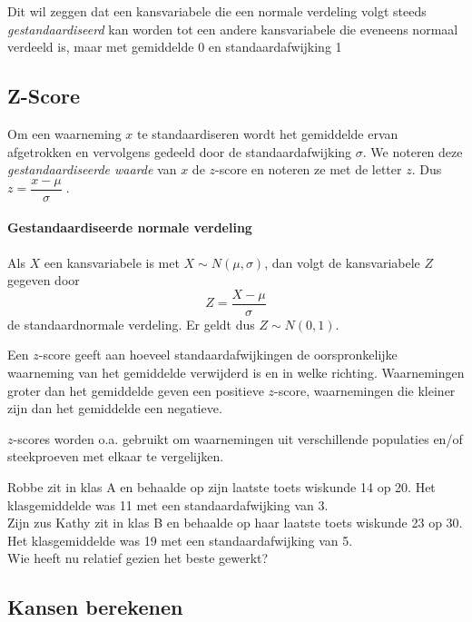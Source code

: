 \documentclass[12pt,twoside,a4paper]{article}
\begin{document}
Dit wil zeggen dat een kansvariabele die een normale verdeling volgt steeds {\em gestandaardiseerd} kan worden tot een andere kansvariabele die eveneens normaal verdeeld is, maar met gemiddelde 0 en standaardafwijking 1

\subsection{Z-Score}

Om een waarneming $x$ te standaardiseren wordt het gemiddelde ervan afgetrokken en vervolgens gedeeld door de standaardafwijking $\sigma$. We noteren deze {\em gestandaardiseerde waarde} van $x$ de $z$-score en noteren ze met de letter $z$. Dus
$z=\dfrac{x-\mu}{\sigma}\;.$

\paragraph*{Gestandaardiseerde normale verdeling}
\begin{mdframed}
Als $X$ een kansvariabele is met $X\sim N(\mu,\sigma)$, dan volgt de kansvariabele $Z$ gegeven door
$$Z=\dfrac{X-\mu}{\sigma}$$
de standaardnormale verdeling. Er geldt dus $Z\sim N(0,1)$.
\end{mdframed}

Een $z$-score geeft aan hoeveel standaardafwijkingen de oorspronkelijke waarneming van het gemiddelde verwijderd is en in welke richting. Waarnemingen groter dan het gemiddelde geven een positieve $z$-score, waarnemingen die kleiner zijn dan het gemiddelde een negatieve.

$z$-scores worden o.a. gebruikt om waarnemingen uit verschillende populaties en/of steekproeven met elkaar te vergelijken.

\begin{oefening}
Robbe zit in klas A en behaalde op zijn laatste toets wiskunde 14 op 20. Het klasgemiddelde was 11 met een standaardafwijking van 3.\\
Zijn zus Kathy zit in klas B en behaalde op haar laatste toets wiskunde 23 op 30. Het klasgemiddelde was 19 met een standaardafwijking van 5.\\
Wie heeft nu relatief gezien het beste gewerkt?
\end{oefening}

\subsection{Kansen berekenen}
\end{document}
